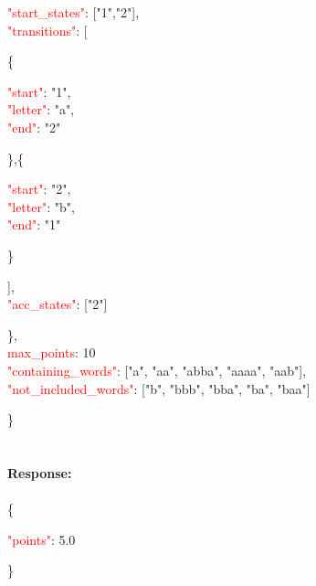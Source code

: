     \begin{adjustwidth}{7.5 mm}{0 cm}
     \begin{adjustwidth}{7.5 mm}{0 cm}
        \textcolor{red}{"start\_states"}: ["1","2"], \\
        \textcolor{red}{"transitions"}: [
        \begin{adjustwidth}{7.5 mm}{0 cm}
          \{
            \begin{adjustwidth}{7.5 mm}{0 cm}
            \textcolor{red}{"start"}: "1", \\
            \textcolor{red}{"letter"}: "a", \\
            \textcolor{red}{"end"}: "2" 
            \end{adjustwidth}
          \},\{ 
            \begin{adjustwidth}{7.5 mm}{0 cm}
            \textcolor{red}{"start"}: "2",\\
            \textcolor{red}{"letter"}: "b", \\
            \textcolor{red}{"end"}: "1"
            \end{adjustwidth}
          \}
        \end{adjustwidth}
        ],\\
        \textcolor{red}{"acc\_states"}: ["2"]
    \end{adjustwidth}
    \},\\
  \textcolor{red}{max\_points}: 10 \\
  \textcolor{red}{"containing\_words"}: ["a", "aa", "abba", "aaaa", "aab"],\\
  \textcolor{red}{"not\_included\_words"}: ["b", "bbb", "bba", "ba", "baa"]
  \end{adjustwidth}
     \} \\
     \ \\
\ \\
\textbf{Response:}\\
\ \\
\{
    \begin{adjustwidth}{7.5 mm}{0 cm}
    \textcolor{red}{"points"}: 5.0
    \end{adjustwidth}
\}
